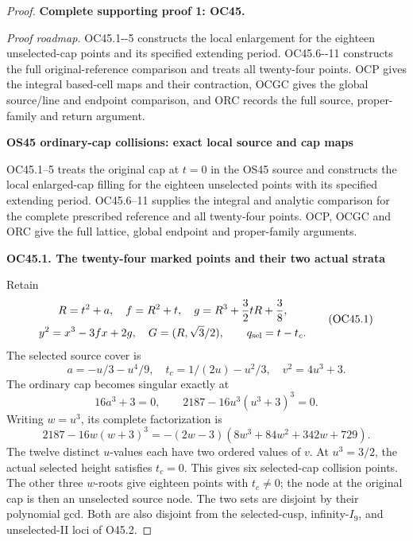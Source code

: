 \begin{proof}

\par\bigskip\noindent\textbf{Complete supporting proof 1: OC45.}\par


\emph{Proof roadmap.}
OC45.1-\/-5 constructs the local enlargement for the eighteen
unselected-cap points and its specified extending period.
OC45.6-\/-11 constructs the full original-reference comparison
and treats all twenty-four points. OCP gives the integral
based-cell maps and their contraction, OCGC gives the global
source/line and endpoint comparison, and ORC records the full
source, proper-family and return argument.

\par

\medskip\noindent\textbf{OS45 ordinary-cap collisions: exact local source and cap maps}

\par\nobreak

OC45.1--5 treats the original cap at \(t=0\) in the
OS45 source and constructs the local enlarged-cap filling
for the eighteen unselected points with its specified
extending period. OC45.6--11 supplies the integral and
analytic comparison for the complete prescribed reference
and all twenty-four points. OCP, OCGC and ORC give the
full lattice, global endpoint and proper-family arguments.

\par

\medskip\noindent\textbf{OC45.1. The twenty-four marked points and their two actual strata}

\par\nobreak

Retain
\[
\begin{gathered}
 R=t^2+a,\quad f=R^2+t,\quad
 g=R^3+\frac32tR+\frac38,\\
 y^2=x^3-3fx+2g,\quad G=(R,\sqrt3/2),
 \qquad q_{\rm sel}=t-t_c.
\end{gathered}
 \tag{OC45.1}
\]
The selected source cover is
\[
 a=-u/3-u^4/9,\quad t_c=1/(2u)-u^2/3,\quad
 v^2=4u^3+3.
 \tag{OC45.2}
\]
The ordinary cap becomes singular exactly at
\[
 16a^3+3=0,\qquad
 2187-16u^3(u^3+3)^3=0.
 \tag{OC45.3}
\]
Writing \(w=u^3\), its complete factorization is
\[
 2187-16w(w+3)^3
       =-(2w-3)(8w^3+84w^2+342w+729).
 \tag{OC45.4}
\]
The twelve distinct \(u\)-values each have two ordered values of \(v\).
At \(u^3=3/2\), the actual selected height satisfies \(t_c=0\).
This gives six selected-cap collision points.
The other three \(w\)-roots give eighteen points with \(t_c\ne0\);
the node at the original cap is then an unselected source node.
The two sets are disjoint by their polynomial gcd. Both are also
disjoint from the selected-cusp, infinity-\(I_9\), and unselected-II
loci of O45.2.


\end{proof}
